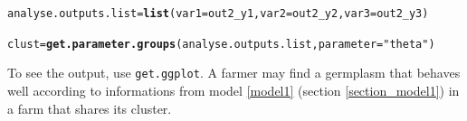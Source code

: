 \documentclass{article}\usepackage[]{graphicx}\usepackage[]{color}
\makeatletter
\newcommand{\hlstr}[1]{\textcolor[rgb]{0.192,0.494,0.8}{#1}}%
\newcommand{\hlstd}[1]{\textcolor[rgb]{0.345,0.345,0.345}{#1}}%
\newcommand{\hlkwb}[1]{\textcolor[rgb]{0.69,0.353,0.396}{#1}}%
\newcommand{\hlkwc}[1]{\textcolor[rgb]{0.333,0.667,0.333}{#1}}%
\newcommand{\hlkwd}[1]{\textcolor[rgb]{0.737,0.353,0.396}{\textbf{#1}}}%
\newenvironment{kframe}{%
 \def\at@end@of@kframe{}%
 \ifinner\ifhmode%
  \def\at@end@of@kframe{\end{minipage}}%
  \begin{minipage}{\columnwidth}%
 \fi\fi%
 \def\FrameCommand##1{\hskip\@totalleftmargin \hskip-\fboxsep
 \colorbox{shadecolor}{##1}\hskip-\fboxsep
     \hskip-\linewidth \hskip-\@totalleftmargin \hskip\columnwidth}%
 \MakeFramed {\advance\hsize-\width
   \@totalleftmargin\z@ \linewidth\hsize
   \@setminipage}}%
 {\par\unskip\endMakeFramed%
 \at@end@of@kframe}
\newenvironment{knitrout}{}{} %
\makeatother
\begin{document}
\begin{knitrout}
\begin{kframe}
{\ttfamily\noindent\itshape\color{messagecolor}{\#\# The experimental design plot is done.\\\#\# The Gelman-Rubin test is running for each parameter ...\\\#\# The two MCMC for each parameter converge thanks to the Gelman-Rubin test.\\\#\# The alpha\_i posterior distributions are done.\\\#\# The beta\_i posterior distributions are done.\\\#\# The theta\_j posterior distributions are done.}}\begin{alltt}
\hlstd{analyse.outputs.list} \hlkwb{=} \hlkwd{list}\hlstd{(}\hlkwc{var1} \hlstd{= out2_y1,} \hlkwc{var2} \hlstd{= out2_y2,} \hlkwc{var3} \hlstd{= out2_y3)}

\hlstd{clust} \hlkwb{=} \hlkwd{get.parameter.groups}\hlstd{(analyse.outputs.list,} \hlkwc{parameter} \hlstd{=} \hlstr{"theta"}\hlstd{)}
\end{alltt}
\end{kframe}
\end{knitrout}

To see the output, use \texttt{get.ggplot}.
A farmer may find a germplasm that behaves well according to informations from model \ref{model1} (section \ref{section_model1}) in a farm that shares its cluster.
\end{document}
